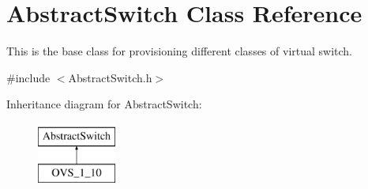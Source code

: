 \hypertarget{classAbstractSwitch}{\section{\-Abstract\-Switch \-Class \-Reference}
\label{classAbstractSwitch}
}


\-This is the base class for provisioning different classes of virtual switch.  




{\ttfamily \#include $<$\-Abstract\-Switch.\-h$>$}

\-Inheritance diagram for \-Abstract\-Switch\-:\begin{figure}[H]
\begin{center}
\leavevmode
\includegraphics[height=2.000000cm]{classAbstractSwitch}
\end{center}
\end{figure}
